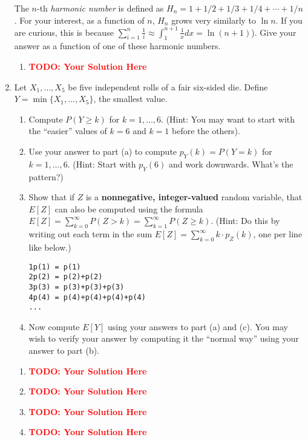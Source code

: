 \documentclass[12pt]{article}
\def\todo#1{\textcolor{red}{\textbf{#1}}}
\renewcommand{\|}{\mid}
\begin{document}
\begin{enumerate}
  The $n$-th {\em harmonic number} is defined as $H_n = 1 + 1/2 + 1/3
  + 1/4 + \cdots + 1/n$.  For your interest, as a function of $n$,
  $H_n$ grows very similarly to $\ln n$.  If you are curious, this is because $\sum_{i=1}^n{\frac{1}{i}}\approx\int_1^{n+1}{\frac{1}{x}dx}=\ln(n+1)$).  Give your answer as a function of one of these harmonic
  numbers.

\begin{tcolorbox}
\begin{enumerate}
\item \todo{TODO: Your Solution Here}
\end{enumerate}
\end{tcolorbox}

    
    \item Let $X_1,\dots,X_5$ be five independent rolls of a fair six-sided die. Define $Y=\min\{X_1,\dots,X_5\}$, the smallest value. 
    \begin{enumerate}
        \item Compute $P(Y\ge k)$ for $k=1,\dots,6$. (Hint: You may want to start with the ``easier'' values of $k=6$ and $k=1$ before the others).
        \item Use your answer to part (a) to compute $p_Y(k)=P(Y=k)$ for $k=1,\dots,6$. (Hint: Start with $p_Y(6)$ and work downwards. What's the pattern?)
        \item Show that if $Z$ is a \textbf{nonnegative, integer-valued} random variable, that $E[Z]$ can also be computed using the formula $E[Z]=\sum_{k=0}^\infty{P(Z>k)}=\sum_{k=1}^\infty{P(Z\ge k)}$. (Hint: Do this by writing out each term in the sum $E[Z]=\sum_{k=0}^\infty{k\cdot p_Z(k)}$, one per line like below.)
        \begin{verbatim}
1p(1) = p(1)
2p(2) = p(2)+p(2)
3p(3) = p(3)+p(3)+p(3)
4p(4) = p(4)+p(4)+p(4)+p(4)
...
        \end{verbatim}
    \item Now compute $E[Y]$ using your answers to part (a) and (c). You may wish to verify your answer by computing it the ``normal way'' using your answer to part (b).
    \end{enumerate}
    
\begin{tcolorbox}
\begin{enumerate}
\item \todo{TODO: Your Solution Here}
\item \todo{TODO: Your Solution Here}
\item \todo{TODO: Your Solution Here}
\item \todo{TODO: Your Solution Here}
\end{enumerate}
\end{tcolorbox}
    

\end{enumerate}
\end{document}
